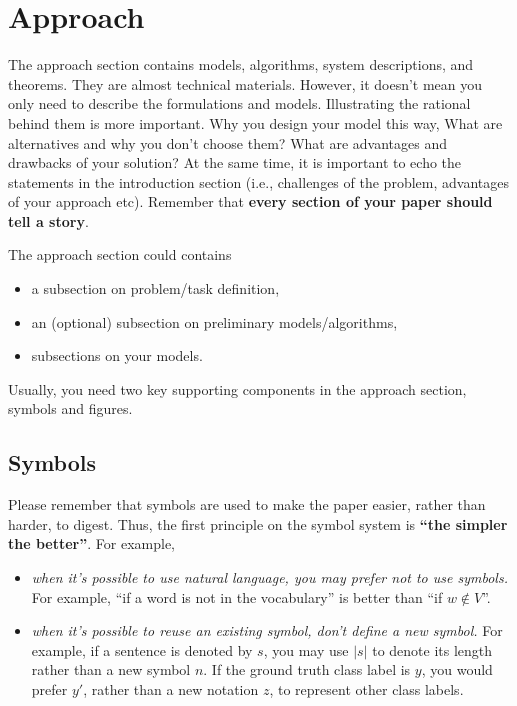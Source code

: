 \section{Approach}

The approach section contains models, algorithms, system descriptions, and theorems.
They are almost technical materials.
However, it doesn't mean you only need to describe the formulations and models.
Illustrating the rational behind them is more important.
Why you design your model this way,
What are alternatives and why you don't choose them?
What are advantages and drawbacks of your solution?
At the same time, 
it is important to echo the statements in the introduction section
(i.e., challenges of the problem, advantages of your approach etc).
Remember that
\textbf{every section of your paper should tell a story}.

The approach section could contains
\begin{itemize}
    \item a subsection on problem/task definition,
    \item an (optional) subsection on preliminary models/algorithms,
    \item subsections on your models.
    \end{itemize}
Usually, you need two key supporting components in the approach section, 
symbols and figures.

\subsection{Symbols}
Please remember that 
symbols are used to make the paper easier, rather than harder, to digest.
Thus, the first principle on the symbol system is \textbf{``the simpler the better''}.
For example,
\begin{itemize}
    \item \emph{when it's possible to use natural language, 
        you may prefer not to use symbols. }
        For example, 
        ``if a word is not in the vocabulary'' is better than
        ``if $w \notin V$''.
    \item \emph{when it's possible to reuse an existing symbol, don't define a new symbol.}
        For example, if a sentence is denoted by $s$, 
        you may use $|s|$ to denote its length rather than a new symbol $n$.
        If the ground truth class label is $y$, you would prefer $y'$, 
        rather than a new notation $z$, to represent other class labels.
\end{itemize}


